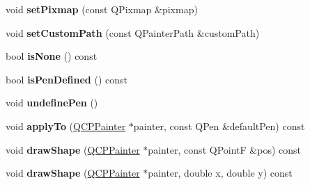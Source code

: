 \begin{DoxyCompactItemize}
void {\bfseries set\+Pixmap} (const Q\+Pixmap \&pixmap)
\item 
\mbox{\label{class_q_c_p_scatter_style_a96a3e949f90b2afe5677ca9412a12a1e}} 
void {\bfseries set\+Custom\+Path} (const Q\+Painter\+Path \&custom\+Path)
\item 
\mbox{\label{class_q_c_p_scatter_style_a72db6bcb1e1abd6e53c1315dd3dea7e4}} 
bool {\bfseries is\+None} () const
\item 
\mbox{\label{class_q_c_p_scatter_style_a47077eb6450fe9a788f833e4ec1b1d5a}} 
bool {\bfseries is\+Pen\+Defined} () const
\item 
\mbox{\label{class_q_c_p_scatter_style_acabc2a8c83d650b946f50c3166b6c35e}} 
void {\bfseries undefine\+Pen} ()
\item 
\mbox{\label{class_q_c_p_scatter_style_afd8044ece445300499ca0dc164821e0f}} 
void {\bfseries apply\+To} (\hyperlink{class_q_c_p_painter}{Q\+C\+P\+Painter} $\ast$painter, const Q\+Pen \&default\+Pen) const
\item 
\mbox{\label{class_q_c_p_scatter_style_a89b5105e6027bfcbfeefed9d201b607c}} 
void {\bfseries draw\+Shape} (\hyperlink{class_q_c_p_painter}{Q\+C\+P\+Painter} $\ast$painter, const Q\+PointF \&pos) const
\item 
\mbox{\label{class_q_c_p_scatter_style_a95c297b114c77c22428ef40f54620ddf}} 
void {\bfseries draw\+Shape} (\hyperlink{class_q_c_p_painter}{Q\+C\+P\+Painter} $\ast$painter, double x, double y) const
\end{DoxyCompactItemize}

